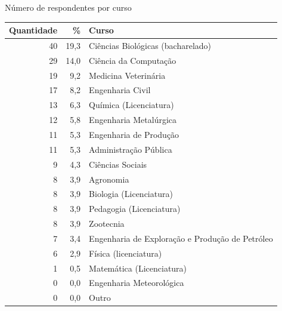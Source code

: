 \begin{apendicesenv}
  \begin{CenteredTable} \caption{Número de respondentes por curso} \label{table:2.1_SobreVoce_Cursos}
    \begin{tabular}{| r r l |}
      \hline
      \textbf{Quantidade} & \%   & \textbf{Curso}                                  \\
      \hline
      40                  & 19,3 & Ciências Biológicas (bacharelado)               \\
      29                  & 14,0 & Ciência da Computação                           \\
      19                  & 9,2  & Medicina Veterinária                            \\
      17                  & 8,2  & Engenharia Civil                                \\
      13                  & 6,3  & Química (Licenciatura)                          \\
      12                  & 5,8  & Engenharia Metalúrgica                          \\
      11                  & 5,3  & Engenharia de Produção                          \\
      11                  & 5,3  & Administração Pública                           \\
      9                   & 4,3  & Ciências Sociais                                \\
      8                   & 3,9  & Agronomia                                       \\
      8                   & 3,9  & Biologia (Licenciatura)                         \\
      8                   & 3,9  & Pedagogia (Licenciatura)                        \\
      8                   & 3,9  & Zootecnia                                       \\
      7                   & 3,4  & Engenharia de Exploração e Produção de Petróleo \\
      6                   & 2,9  & Física (licenciatura)                           \\
      1                   & 0,5  & Matemática (Licenciatura)                       \\
      0                   & 0,0  & Engenharia Meteorológica                        \\
      0                   & 0,0  & Outro                                           \\
      \hline
    \end{tabular}
  \end{CenteredTable}


\end{apendicesenv}
